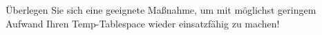     \item \"Uberlegen Sie sich eine geeignete Ma\ss{}nahme, um mit m\"oglichst geringem Aufwand Ihren Temp-Tablespace wieder einsatzf\"ahig zu machen!
